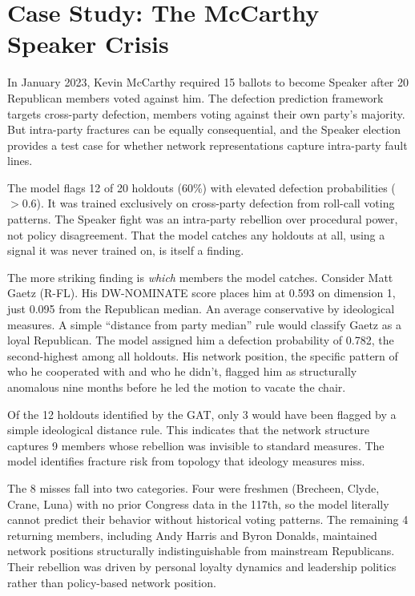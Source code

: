 \documentclass[12pt, a4paper]{article}
\begin{document}
\section{Case Study: The McCarthy Speaker Crisis}

In January 2023, Kevin McCarthy required 15 ballots to become Speaker after 20 Republican members voted against him. The defection prediction framework targets cross-party defection, members voting against their own party's majority. But intra-party fractures can be equally consequential, and the Speaker election provides a test case for whether network representations capture intra-party fault lines.

The model flags 12 of 20 holdouts (60\%) with elevated defection probabilities ($> 0.6$). It was trained exclusively on cross-party defection from roll-call voting patterns. The Speaker fight was an intra-party rebellion over procedural power, not policy disagreement. That the model catches any holdouts at all, using a signal it was never trained on, is itself a finding.

The more striking finding is \textit{which} members the model catches. Consider Matt Gaetz (R-FL). His DW-NOMINATE score places him at 0.593 on dimension 1, just 0.095 from the Republican median. An average conservative by ideological measures. A simple ``distance from party median'' rule would classify Gaetz as a loyal Republican. The model assigned him a defection probability of 0.782, the second-highest among all holdouts. His network position, the specific pattern of who he cooperated with and who he didn't, flagged him as structurally anomalous nine months before he led the motion to vacate the chair.

Of the 12 holdouts identified by the GAT, only 3 would have been flagged by a simple ideological distance rule. This indicates that the network structure captures 9 members whose rebellion was invisible to standard measures. The model identifies fracture risk from topology that ideology measures miss.

The 8 misses fall into two categories. Four were freshmen (Brecheen, Clyde, Crane, Luna) with no prior Congress data in the 117th, so the model literally cannot predict their behavior without historical voting patterns. The remaining 4 returning members, including Andy Harris and Byron Donalds, maintained network positions structurally indistinguishable from mainstream Republicans. Their rebellion was driven by personal loyalty dynamics and leadership politics rather than policy-based network position.
\end{document}
